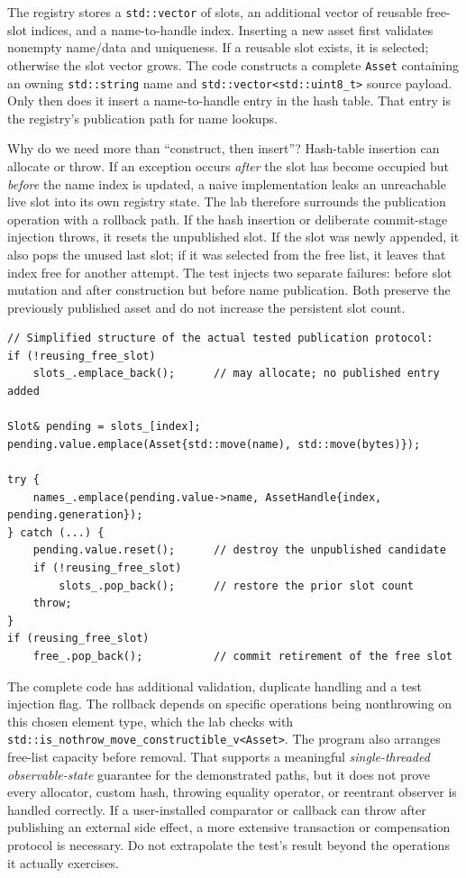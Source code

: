The registry stores a \texttt{std::vector} of slots, an additional vector of reusable free-slot indices, and a name-to-handle index. Inserting a new asset first validates nonempty name/data and uniqueness. If a reusable slot exists, it is selected; otherwise the slot vector grows. The code constructs a complete \texttt{Asset} containing an owning \texttt{std::string} name and \texttt{std::vector\textless{}std::uint8\_t\textgreater{}} source payload. Only then does it insert a name-to-handle entry in the hash table. That entry is the registry's publication path for name lookups.

Why do we need more than ``construct, then insert''? Hash-table insertion can allocate or throw. If an exception occurs \emph{after} the slot has become occupied but \emph{before} the name index is updated, a naive implementation leaks an unreachable live slot into its own registry state. The lab therefore surrounds the publication operation with a rollback path. If the hash insertion or deliberate commit-stage injection throws, it resets the unpublished slot. If the slot was newly appended, it also pops the unused last slot; if it was selected from the free list, it leaves that index free for another attempt. The test injects two separate failures: before slot mutation and after construction but before name publication. Both preserve the previously published asset and do not increase the persistent slot count.

\begin{verbatim}
// Simplified structure of the actual tested publication protocol:
if (!reusing_free_slot)
    slots_.emplace_back();      // may allocate; no published entry added

Slot& pending = slots_[index];
pending.value.emplace(Asset{std::move(name), std::move(bytes)});

try {
    names_.emplace(pending.value->name, AssetHandle{index, pending.generation});
} catch (...) {
    pending.value.reset();      // destroy the unpublished candidate
    if (!reusing_free_slot)
        slots_.pop_back();      // restore the prior slot count
    throw;
}
if (reusing_free_slot)
    free_.pop_back();           // commit retirement of the free slot
\end{verbatim}

The complete code has additional validation, duplicate handling and a test injection flag. The rollback depends on specific operations being nonthrowing on this chosen element type, which the lab checks with \texttt{std::is\_nothrow\_move\_constructible\_v\textless{}Asset\textgreater{}}. The program also arranges free-list capacity before removal. That supports a meaningful \emph{single-threaded observable-state} guarantee for the demonstrated paths, but it does not prove every allocator, custom hash, throwing equality operator, or reentrant observer is handled correctly. If a user-installed comparator or callback can throw after publishing an external side effect, a more extensive transaction or compensation protocol is necessary. Do not extrapolate the test's result beyond the operations it actually exercises.

